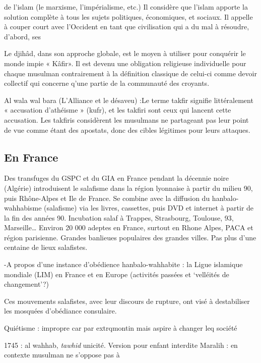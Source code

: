 de l’islam (le marxisme, l’impérialisme, etc.) Il considère que l’islam apporte la solution
complète à tous les sujets politiques, économiques, et sociaux. Il appelle à couper
court avec l’Occident en tant que civilisation qui a du mal à résoudre, d’abord, ses
 \item Le djihâd, dans son approche globale, est le moyen à utiliser pour conquérir le monde
impie « Kâfir». Il est devenu une obligation religieuse individuelle pour chaque
musulman contrairement à la définition classique de celui-ci comme devoir collectif
qui concerne q’une partie de la communauté des croyants.
\item Al wala wal bara (L’Alliance et le désaveu)  :Le terme takfir signifie littéralement « accusation d'athéisme » (kufr), et les takfiri sont ceux qui lancent cette accusation. Les takfiris considèrent les musulmans ne partageant pas leur point de vue comme étant des apostats, donc des cibles légitimes pour leurs attaques.
\ei



\subsection{En France}

Des transfuges du GSPC et du GIA en France pendant la décennie noire (Algérie) introduisent le salafisme dans la région lyonnaise à partir du milieu 90, puis Rhône-Alpes et Ile de France. Se combine avec la diffusion du hanbalo-wahhabisme (salafisme) via les livres, cassettes, puis DVD et internet à partir de la fin des années 90. Incubation salaf à Trappes, Strasbourg, Toulouse, 93, Marseille…
Environ 20 000 adeptes en France, surtout en Rhone Alpes, PACA et région parisienne. Grandes banlieues populaires des grandes villes. Pas plus d'une centaine de lieux salafistes.



-A propos d’une instance d’obédience hanbalo-wahhabite : la Ligue islamique mondiale (LIM) en France et en Europe (activités passées et ‘velléités de changement’?)

Ces mouvements salafistes, avec leur discours de rupture, ont visé à destabiliser les mosquées d'obédiance consulaire.


Quiétisme : impropre car par extrqmontin mais aspire à changer leq société

1745 : al wahhab, \textit{tawhid} unicité. Version pour enfant interdite
Maralih : en contexte musulman ne s’oppose pas à 

